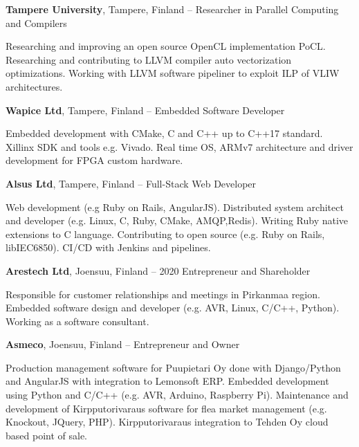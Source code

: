 \documentclass[letterpaper,MMMyyyy,nonstopmode]{simpleresumecv}
\begin{document}
\begin{Body}
\BigGap
\Entry
\textbf{Tampere University}, Tampere, Finland
\hfill
{} --  
\Gap
\BulletItem Researcher in Parallel Computing and Compilers
\begin{Detail}
    \SubBulletItem Researching and improving an open source OpenCL
    implementation PoCL.
    \SubBulletItem Researching and contributing to LLVM compiler auto
    vectorization optimizations.
    \SubBulletItem Working with LLVM software pipeliner to exploit ILP of VLIW
    architectures.
\end{Detail}

\BigGap
\Entry
\textbf{Wapice Ltd}, Tampere, Finland
\hfill
{} -- 
\Gap
\BulletItem Embedded Software Developer
\begin{Detail}
    \SubBulletItem Embedded development with CMake, C and C++ up to C++17 standard.
    \SubBulletItem Xillinx SDK and tools e.g. Vivado.
    \SubBulletItem Real time OS, ARMv7 architecture and driver development for FPGA custom hardware.
\end{Detail}

\BigGap
\Entry
\textbf{Alsus Ltd}, Tampere, Finland
\hfill
{} -- 
\Gap
\BulletItem Full-Stack Web Developer
\begin{Detail}
    \SubBulletItem Web development (e.g Ruby on Rails, AngularJS).
    \SubBulletItem Distributed system architect and developer (e.g. Linux, C, Ruby,
    CMake, AMQP,\newline  Redis).
    \SubBulletItem Writing Ruby native extensions to C language.
    \SubBulletItem Contributing to open source (e.g. Ruby on Rails, libIEC6850).
    \SubBulletItem CI/CD with Jenkins and pipelines.
\end{Detail}

\BigGap
\Entry
\textbf{Arestech Ltd}, Joensuu, Finland
\hfill
{} -- 2020
\Gap
\BulletItem Entrepreneur and Shareholder
\begin{Detail}
    \SubBulletItem Responsible for customer relationships and meetings in
    Pirkanmaa region.
    \SubBulletItem Embedded software design and developer (e.g. AVR, Linux,
    C/C++, Python).
    \SubBulletItem Working as a software consultant.
\end{Detail}

\BigGap
\Entry
\textbf{Asmeco}, Joensuu, Finland
\hfill
{} -- 
\Gap
\BulletItem Entrepreneur and Owner
\begin{Detail}
    \SubBulletItem Production management software for Puupietari Oy done with
    Django/Python and \newline AngularJS with integration to Lemonsoft ERP.
    \SubBulletItem Embedded development using Python and C/C++ (e.g. AVR,
    Arduino, Raspberry Pi).
    \SubBulletItem Maintenance and development of Kirpputorivaraus software for
    flea market \newline management (e.g. Knockout, JQuery, PHP).
    \SubBulletItem Kirpputorivaraus integration to Tehden Oy cloud based point
    of sale.
\end{Detail}


\end{Body}
\end{document}
